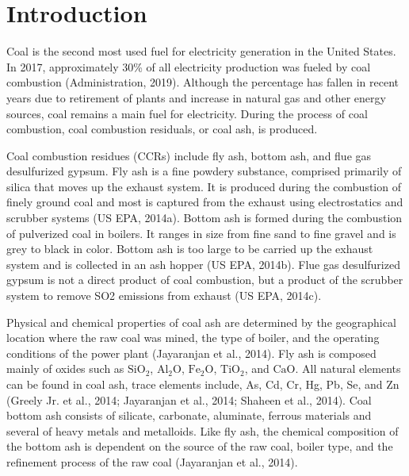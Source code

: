 \documentclass[ms]{uncgdissertationexp}
\theoremstyle{plain}
\theoremstyle{definition}
\theoremstyle{remark}
\begin{document}
  \chapter{Introduction}\label{intro}
  
  Coal is the second most used fuel for electricity generation in the
  United States. In 2017, approximately 30\% of all electricity production
  was fueled by coal combustion (Administration, 2019). Although the
  percentage has fallen in recent years due to retirement of plants and
  increase in natural gas and other energy sources, coal remains a main
  fuel for electricity. During the process of coal combustion, coal
  combustion residuals, or coal ash, is produced.
  
  Coal combustion residues (CCRs) include fly ash, bottom ash, and flue
  gas desulfurized gypsum. Fly ash is a fine powdery substance, comprised
  primarily of silica that moves up the exhaust system. It is produced
  during the combustion of finely ground coal and most is captured from
  the exhaust using electrostatics and scrubber systems (US EPA, 2014a).
  Bottom ash is formed during the combustion of pulverized coal in
  boilers. It ranges in size from fine sand to fine gravel and is grey to
  black in color. Bottom ash is too large to be carried up the exhaust
  system and is collected in an ash hopper (US EPA, 2014b). Flue gas
  desulfurized gypsum is not a direct product of coal combustion, but a
  product of the scrubber system to remove SO2 emissions from exhaust (US
  EPA, 2014c).
  
  Physical and chemical properties of coal ash are determined by the
  geographical location where the raw coal was mined, the type of boiler,
  and the operating conditions of the power plant (Jayaranjan et al.,
  2014). Fly ash is composed mainly of oxides such as \(\mathrm{SiO_2}\),
  \(\mathrm{Al_2O}\), \(\mathrm{Fe_2O}\), \(\mathrm{TiO_2}\), and
  \(\mathrm{CaO}\). All natural elements can be found in coal ash, trace
  elements include, As, Cd, Cr, Hg, Pb, Se, and Zn (Greely Jr. et al.,
  2014; Jayaranjan et al., 2014; Shaheen et al., 2014). Coal bottom ash
  consists of silicate, carbonate, aluminate, ferrous materials and
  several of heavy metals and metalloids. Like fly ash, the chemical
  composition of the bottom ash is dependent on the source of the raw
  coal, boiler type, and the refinement process of the raw coal
  (Jayaranjan et al., 2014).
  
\end{document}
